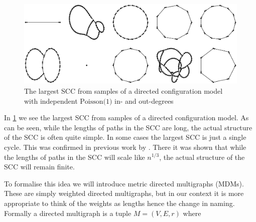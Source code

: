 \begin{figure}[htbp]
    \centering

    \includegraphics[width=\textwidth]{Content/Pictures/largest_sccs.eps}
    
    \caption{The largest SCC from samples of a directed configuration model with independent $\text{Poisson(1)}$ in- and out-degrees}
    \label{fig:largest-sccs}
\end{figure}

In \cref{fig:largest-sccs}  we see the largest SCC from samples of a directed configuration model. As can be seen, while the lengths of paths in the SCC are long, the actual structure of the SCC is often quite simple. In some cases the largest SCC is just a single cycle.  This was confirmed in previous work by . There it was shown that while the lengths of paths in the SCC will scale like $n^{1/3}$, the actual structure of the SCC will remain finite.

To formalise this idea we will introduce metric directed multigraphs (MDMs). These are simply weighted directed multigraphs, but in our context it is more appropriate to think of the weights as lengths hence the change in naming. Formally a directed multigraph is a tuple $M = (V, E, r)$ where
